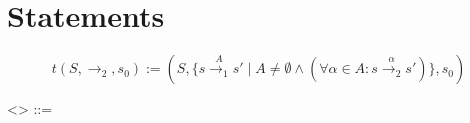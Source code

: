 %
%


\section{Statements} \label{sec:statements}




\[t (S, \rightarrow_2 , s_0) := (S, \{ s  \stackrel {A} {\rightarrow_1}  s'  \mid A \neq \emptyset \wedge  (\forall \alpha \in A : s \stackrel {\alpha} {\rightarrow_2}  s') \}, s_0)\]



\begin{bnf}

  <> ::= 

\end{bnf}

